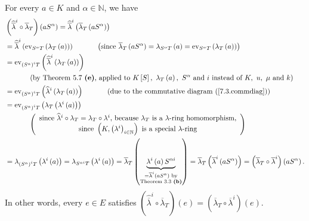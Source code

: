 \documentclass[numbers=enddot,12pt,final,onecolumn,notitlepage]{scrartcl}%
\begin{document}
For every $a\in K$ and $\alpha\in\mathbb{N}$, we have%
\begin{align*}
&  \left(  \widehat{\overline{\lambda}}^{i}\circ\overline{\lambda}_{T}\right)
\left(  aS^{\alpha}\right)  =\widehat{\overline{\lambda}}^{i}\left(
\overline{\lambda}_{T}\left(  aS^{\alpha}\right)  \right) \\
&  =\widehat{\overline{\lambda}}^{i}\left(  \operatorname*{ev}%
\nolimits_{S^{\alpha}T}\left(  \lambda_{T}\left(  a\right)  \right)  \right)
\ \ \ \ \ \ \ \ \ \ \left(  \text{since }\overline{\lambda}_{T}\left(
aS^{\alpha}\right)  =\lambda_{S^{\alpha}T}\left(  a\right)
=\operatorname*{ev}\nolimits_{S^{\alpha}T}\left(  \lambda_{T}\left(  a\right)
\right)  \right) \\
&  =\operatorname*{ev}\nolimits_{\left(  S^{\alpha}\right)  ^{i}T}\left(
\widehat{\overline{\lambda}}^{i}\left(  \lambda_{T}\left(  a\right)  \right)
\right) \\
&  \ \ \ \ \ \ \ \ \ \ \left(  \text{by Theorem 5.7 \textbf{(e)}, applied to
}K\left[  S\right]  ,\text{ }\lambda_{T}\left(  a\right)  ,\text{ }S^{\alpha
}\text{ and }i\text{ instead of }K,\text{ }u,\text{ }\mu\text{ and }k\right)
\\
&  =\operatorname*{ev}\nolimits_{\left(  S^{\alpha}\right)  ^{i}T}\left(
\widehat{\lambda}^{i}\left(  \lambda_{T}\left(  a\right)  \right)  \right)
\ \ \ \ \ \ \ \ \ \ \left(  \text{due to the commutative diagram
(\ref{7.3.commdiag})}\right) \\
&  =\operatorname*{ev}\nolimits_{\left(  S^{\alpha}\right)  ^{i}T}\left(
\lambda_{T}\left(  \lambda^{i}\left(  a\right)  \right)  \right) \\
&  \ \ \ \ \ \ \ \ \ \ \left(
\begin{array}
[c]{c}%
\text{since }\widehat{\lambda}^{i}\circ\lambda_{T}=\lambda_{T}\circ\lambda
^{i}\text{, because }\lambda_{T}\text{ is a }\lambda\text{-ring homomorphism,}%
\\
\text{since }\left(  K,\left(  \lambda^{i}\right)  _{i\in\mathbb{N}}\right)
\text{ is a special }\lambda\text{-ring}%
\end{array}
\right) \\
&  =\lambda_{\left(  S^{\alpha}\right)  ^{i}T}\left(  \lambda^{i}\left(
a\right)  \right)  =\lambda_{S^{\alpha i}T}\left(  \lambda^{i}\left(
a\right)  \right)  =\overline{\lambda}_{T}\left(  \underbrace{\lambda
^{i}\left(  a\right)  S^{\alpha i}}_{\substack{=\overline{\lambda}^{i}\left(
aS^{\alpha}\right)  \text{ by}\\\text{Theorem 3.3 \textbf{(b)}}}}\right)
=\overline{\lambda}_{T}\left(  \overline{\lambda}^{i}\left(  aS^{\alpha
}\right)  \right)  =\left(  \overline{\lambda}_{T}\circ\overline{\lambda}%
^{i}\right)  \left(  aS^{\alpha}\right)  .
\end{align*}
In other words, every $e\in E$ satisfies $\left(  \widehat{\overline{\lambda}%
}^{i}\circ\overline{\lambda}_{T}\right)  \left(  e\right)  =\left(
\overline{\lambda}_{T}\circ\overline{\lambda}^{i}\right)  \left(  e\right)  $.
\end{document}
